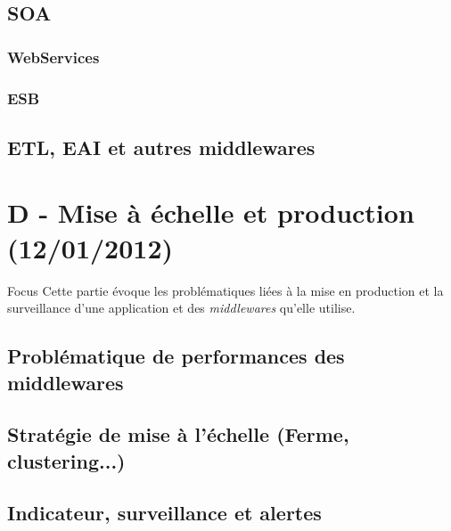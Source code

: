 \subsection{SOA}
\subsubsection{WebServices}

\subsubsection{ESB}
\subsection{ETL, EAI et autres middlewares}

\section{D - Mise à échelle et production (12/01/2012)}
\begin{frame}
  \begin{block}{Focus}
    Cette partie évoque les problématiques liées à la mise en production 
    et la surveillance d'une application et des \textit{middlewares} qu'elle utilise.
  \end{block}
\end{frame}
\subsection{Problématique de performances des middlewares}

\subsection{Stratégie de mise à l'échelle (Ferme, clustering...)}

\subsection{Indicateur, surveillance et alertes}

